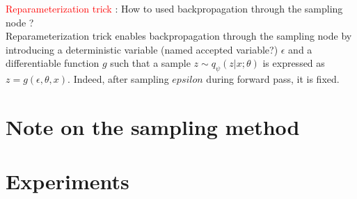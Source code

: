 \documentclass[12pt]{article}
\newcommand{\red}[1]{\textcolor{red}{#1}}
\begin{document}
\red{Reparameterization trick} :
How to used backpropagation through the sampling node ? \\
Reparameterization trick enables backpropagation through the sampling node by introducing a deterministic variable (named accepted variable?) $\epsilon$ and a differentiable function $g$ 
such that a sample $z\sim q_\psi(z|x; \theta)$ is expressed as $z=g(\epsilon, \theta, x)$. Indeed, after sampling $epsilon$ during forward pass, it is fixed.

\section{Note on the sampling method}


\section{Experiments}
\end{document}
